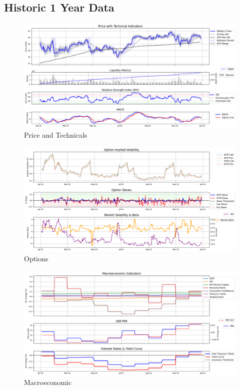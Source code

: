\documentclass[8pt]{scrartcl}
\begin{document}
\subsection*{Historic 1 Year Data}

\begin{figure}[H]
    \centering
    \includegraphics[width=1\linewidth]{judge_reviews/GOOGL_M_gpt-4o-mini//2017-01-02/judge_Price_with_Technical_Indicators.png}
    \caption{Price and Technicals}
\end{figure}

\begin{figure}[H]
    \centering
    \includegraphics[width=1\linewidth]{judge_reviews/GOOGL_M_gpt-4o-mini/2017-01-02/judge_Option_Implied_Volatility.png}
    \caption{Options}
\end{figure}

\begin{figure}[H]
    \centering
    \includegraphics[width=1\linewidth]{judge_reviews/GOOGL_M_gpt-4o-mini/2017-01-02/judge_Macroeconomic_Indicators.png}
    \caption{Macroeconomic}
\end{figure}
\end{document}
